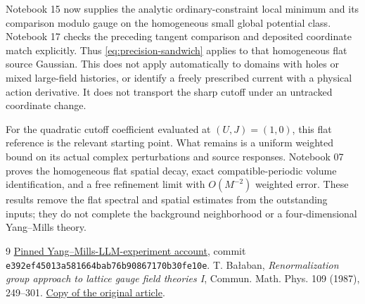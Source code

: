 \documentclass[11pt]{article}
\theoremstyle{remark}
\begin{document}
Notebook 15 now supplies the analytic ordinary-constraint local
minimum and its comparison modulo gauge on the homogeneous small
global potential class. Notebook 17 checks the preceding tangent
comparison and deposited coordinate match explicitly. Thus
\eqref{eq:precision-sandwich} applies to that homogeneous flat
source Gaussian. This does not apply automatically to domains
with holes or mixed large-field
histories, or identify a freely prescribed current with a physical
action derivative. It does not transport the sharp cutoff under
an untracked coordinate change.

For the quadratic cutoff coefficient evaluated at $(U,J)=(1,0)$,
this flat reference is the relevant starting point. What remains
is a uniform weighted bound on its actual complex perturbations
and source responses. Notebook 07 proves the homogeneous flat spatial
decay, exact compatible-periodic volume identification, and a free
refinement limit with $O(M^{-2})$ weighted error. These results remove
the flat spectral and spatial estimates from the outstanding inputs;
they do not complete the background neighborhood or a four-dimensional
Yang--Mills theory.

\begin{thebibliography}{9}
 \href{https://github.com/ethanwsussman/Yang--Mills-LLM-experiment/tree/e392ef45013a581664bab76b90867170b30fe10e}
{Pinned Yang--Mills-LLM-experiment account}, commit
\texttt{e392ef4501\allowbreak 3a581664ba\allowbreak b76b908671\allowbreak 70b30fe10e}.
 T. Ba\l aban,
\emph{Renormalization group approach to lattice gauge field theories I},
Commun. Math. Phys. 109 (1987), 249--301.
\href{https://scispace.com/pdf/renormalization-group-approach-to-lattice-gauge-field-3ygai0vxt1.pdf}
{Copy of the original article}.
\end{thebibliography}
\end{document}
